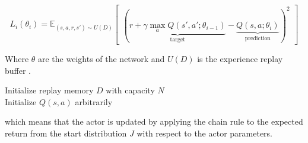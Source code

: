 \begin{equation}
    \label{eq:dql_loss}
    L_i(\theta_i) = \mathbb{E}_{(s, a, r, s') \sim U(D)}\begin{bmatrix}
        ( \underbrace{r + \gamma \max\limits_a Q(s',a'; \theta_{i-1})}_\text{target} - \underbrace{Q(s,a;\theta_i)}_\text{prediction})^2
    \end{bmatrix}
\end{equation}

Where $\theta$ are the weights of the network and $U(D)$ is the experience replay buffer \cite{replay_buffers}.

\begin{algorithm}[h] 
    \fontsize{8pt}{6pt}\selectfont
    Initialize replay memory $D$ with capacity $N$\\
    Initialize $Q(s,a)$ arbitrarily \\
    \caption{Deep Q Learning algorithm}
    \label{al:deep_q_learning}
\end{algorithm}

which means that the  actor is updated by applying the chain rule to the expected return from the start distribution $J$ with respect to the actor parameters.

